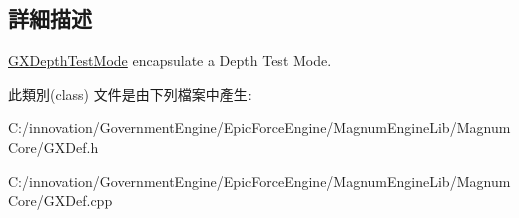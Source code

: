 \subsection{詳細描述}
\hyperlink{class_i_dream_sky_1_1_g_x_depth_test_mode}{G\+X\+Depth\+Test\+Mode} encapsulate a Depth Test Mode. 

此類別(class) 文件是由下列檔案中產生\+:\begin{DoxyCompactItemize}
\item 
C\+:/innovation/\+Government\+Engine/\+Epic\+Force\+Engine/\+Magnum\+Engine\+Lib/\+Magnum\+Core/G\+X\+Def.\+h\item 
C\+:/innovation/\+Government\+Engine/\+Epic\+Force\+Engine/\+Magnum\+Engine\+Lib/\+Magnum\+Core/G\+X\+Def.\+cpp\end{DoxyCompactItemize}
